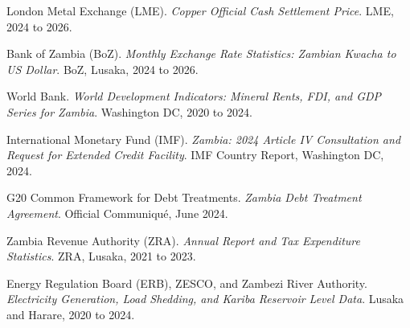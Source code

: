 \documentclass[11pt,a4paper]{article}
\begin{document}
\begin{enumerate}[leftmargin=16pt, itemsep=3pt, label={[\arabic*]}]

\item London Metal Exchange (LME). \textit{Copper Official Cash Settlement
      Price}. LME, 2024 to 2026.

\item Bank of Zambia (BoZ). \textit{Monthly Exchange Rate Statistics:
      Zambian Kwacha to US Dollar}. BoZ, Lusaka, 2024 to 2026.

\item World Bank. \textit{World Development Indicators: Mineral Rents,
      FDI, and GDP Series for Zambia}. Washington DC, 2020 to 2024.

\item International Monetary Fund (IMF). \textit{Zambia: 2024 Article IV
      Consultation and Request for Extended Credit Facility}.
      IMF Country Report, Washington DC, 2024.

\item G20 Common Framework for Debt Treatments. \textit{Zambia Debt
      Treatment Agreement}. Official Communiqué, June 2024.

\item Zambia Revenue Authority (ZRA). \textit{Annual Report and Tax
      Expenditure Statistics}. ZRA, Lusaka, 2021 to 2023.

\item Energy Regulation Board (ERB), ZESCO, and Zambezi River Authority.
      \textit{Electricity Generation, Load Shedding, and Kariba Reservoir
      Level Data}. Lusaka and Harare, 2020 to 2024.

\end{enumerate}
\end{document}
